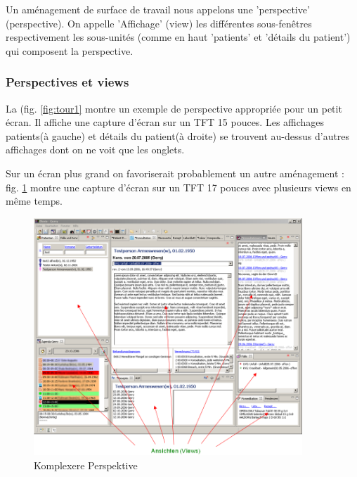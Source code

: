 Un aménagement de surface de travail nous appelons une 'perspective' (perspective). On appelle 'Affichage' (view) les différentes sous-fenêtres respectivement les sous-unités (comme en haut 'patients' et 'détails du patient') qui composent la perspective.

\subsubsection{Perspectives et views}

La (fig. \ref{fig:tour1} montre un exemple de perspective appropriée pour un petit écran.
Il affiche une capture d'écran sur un TFT 15 pouces. Les affichages \glqq
patients\grqq{}(à gauche) et \glqq détails du patient\grqq{}(à droite) se trouvent au-dessus d'autres affichages dont on ne voit que les onglets.

Sur un écran plus grand on favoriserait probablement un autre aménagement : fig. \ref{fig:tour2} montre une capture d'écran sur un TFT 17 pouces avec plusieurs views en même temps.

\begin{figure}[htp]
\begin{center}
  \includegraphics[width=0.9\textwidth]{images/tour2}
  \caption{Komplexere Perspektive}
  \label{fig:tour2}
\end{center}
\end{figure}

